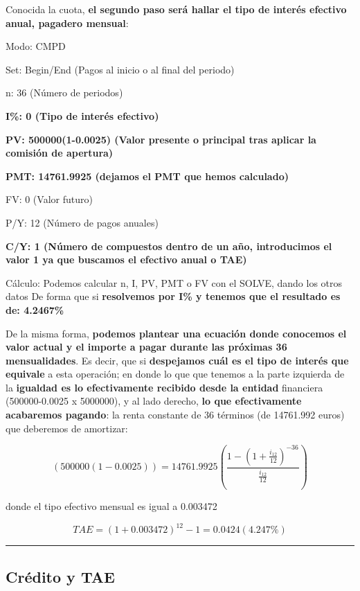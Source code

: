 \documentclass[
  letterpaper,
  DIV=11,
  numbers=noendperiod]{scrreprt}
\begin{document}
\begin{tcolorbox}
\begin{tcolorbox}
Conocida la cuota, \textbf{el segundo paso será hallar el tipo de
interés efectivo anual, pagadero mensual}:

Modo: CMPD

Set: Begin/End (Pagos al inicio o al final del periodo)

n: 36 (Número de periodos)

\textbf{I\%: 0 (Tipo de interés efectivo)}

\textbf{PV: 500000(1-0.0025) (Valor presente o principal tras aplicar la
comisión de apertura)}

\textbf{PMT: 14761.9925 (dejamos el PMT que hemos calculado)}

FV: 0 (Valor futuro)

P/Y: 12 (Número de pagos anuales)

\textbf{C/Y: 1 (Número de compuestos dentro de un año, introducimos el
valor 1 ya que buscamos el efectivo anual o TAE)}

Cálculo: Podemos calcular n, I, PV, PMT o FV con el SOLVE, dando los
otros datos De forma que si \textbf{resolvemos por I\% y tenemos que el
resultado es de: 4.2467\%}

De la misma forma, \textbf{podemos plantear una ecuación donde conocemos
el valor actual y el importe a pagar durante las próximas 36
mensualidades}. Es decir, que si \textbf{despejamos cuál es el tipo de
interés que equivale} a esta operación; en donde lo que que tenemos a la
parte izquierda de la \textbf{igualdad es lo efectivamente recibido
desde la entidad} financiera (500000-0.0025 x 5000000), y al lado
derecho, \textbf{lo que efectivamente acabaremos pagando}: la renta
constante de 36 términos (de 14761.992 euros) que deberemos de
amortizar:

\[\left(500000\left(1-0.0025\right)\right)=14761.9925\left(\frac{1-\left(1+\frac{i_{12}}{12}\right)^{-36}}{\frac{i_{12}}{12}}\right)\]

donde el tipo efectivo mensual es igual a 0.003472

\[TAE=(1+0.003472)^{12}-1=0.0424(4.247\%)\]

\end{tcolorbox}

\begin{center}\rule{0.5\linewidth}{0.5pt}\end{center}

\subsection{Crédito y TAE}\label{cruxe9dito-y-tae-1}


\end{tcolorbox}
\end{document}

